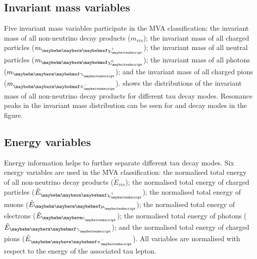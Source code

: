 
\subsection{Invariant mass variables}

Five invariant mass variables participate in the MVA classification: the invariant mass of all non-neutrino decay products ($m_{vis}$); the invariant mass of all charged particles ($m_{\charge}$); the invariant mass of all neutral particles ($m_{\neutral}$); the invariant mass of all photons ($m_{\Pgg}$); and the invariant mass of all charged pions ($m_{\Pgpm}$).  shows the distributions of the invariant mass of all non-neutrino decay products for different tau decay modes. Resonance peaks in the invariant mass distribution can be seen for \Prho and \Pai decay modes in the figure.


\subsection{Energy variables}

Energy information helps to further separate different tau decay modes. Six energy variables are used in the MVA classification: the normalised total energy of all non-neutrino decay products ($\tilde{E}_{vis}$); the normalised total energy of charged particles ($\tilde{E}_{\charge}$); the normalised total energy of muons ($\tilde{E}_{\Pmu}$); the normalised total energy of electrons ($\tilde{E}_{\Pe}$); the normalised total energy of photons ($\tilde{E}_{\Pgg}$); and the normalised total energy of charged pions ($\tilde{E}_{\Pgpm}$). All variables are normalised with respect to the energy of the associated tau lepton.

